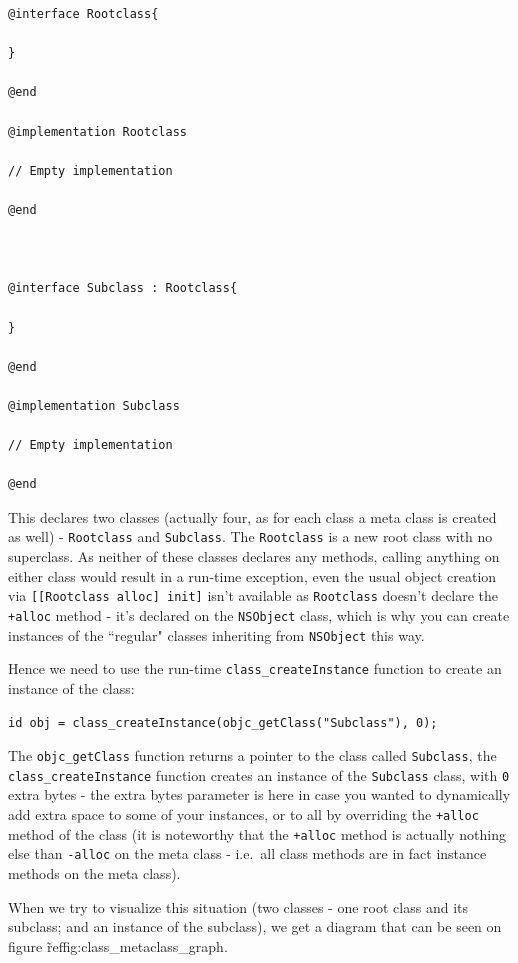 \begin{verbatim}@interface Rootclass{
  
}

@end

@implementation Rootclass

// Empty implementation

@end



@interface Subclass : Rootclass{

}

@end

@implementation Subclass

// Empty implementation

@end 
\end{verbatim}

This declares two classes (actually four, as for each class a meta class is created as well) - \verb=Rootclass= and \verb=Subclass=. The \verb=Rootclass= is a new root class with no superclass. As neither of these classes declares any methods, calling anything on either class would result in a run-time exception, even the usual object creation via \verb=[[Rootclass alloc] init]= isn't available as \verb=Rootclass= doesn't declare the \verb=+alloc= method - it's declared on the \verb=NSObject= class, which is why you can create instances of the ``regular" classes inheriting from \verb=NSObject= this way.

Hence we need to use the run-time \verb=class_createInstance= function to create an instance of the class:

\begin{verbatim}
id obj = class_createInstance(objc_getClass("Subclass"), 0);
\end{verbatim}

The \verb=objc_getClass= function returns a pointer to the class called \verb=Subclass=, the \verb=class_createInstance= function creates an instance of the \verb=Subclass= class, with \verb=0= extra bytes - the extra bytes parameter is here in case you wanted to dynamically add extra space to some of your instances, or to all by overriding the \verb=+alloc= method of the class (it is noteworthy that the \verb=+alloc= method is actually nothing else than \verb=-alloc= on the meta class - i.e.\ all class methods are in fact instance methods on the meta class).


When we try to visualize this situation (two classes - one root class and its subclass; and an instance of the subclass), we get a diagram that can be seen on figure \~ref{fig:class_metaclass_graph}.


